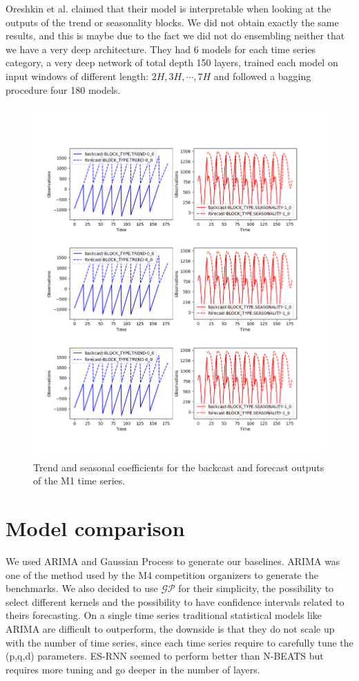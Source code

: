\documentclass{article}
\begin{document}
Oreshkin et al. claimed that their model is interpretable when looking at the outputs of the trend or seasonality blocks. We did not obtain exactly the same results, and this is maybe due to the fact we did not
do ensembling neither that we have a very deep architecture. They had 6 models for each time series category,  a very deep network of total depth 150 layers, trained each model on input windows of
different length: $2H,3H, \cdots, 7H$ and followed a bagging procedure four 180 models.

\begin{figure}[ht]
\centering
	\includegraphics[width=0.8\columnwidth]{M1_stack_reload_100.png} 
\caption{Trend and seasonal coefficients for the backcast and forecast outputs of the M1 time series.}
\label{fig:m1trendseasonality}
\end{figure}


\section{Model comparison}
\label{modelcomparison}

We used ARIMA and Gaussian Process to generate our baselines. ARIMA was one of the method used by the M4 competition organizers to generate the benchmarks.
We also decided to use $\mathcal{GP}$ for their simplicity, the possibility to select different kernels and the possibility to have confidence intervals related to theirs forecasting.
On a single time series traditional statistical models like ARIMA are difficult to outperform, the downside is that they do not scale up with the number of time series, since each time series require to carefully
tune the (p,q,d) parameters. ES-RNN seemed to perform better than N-BEATS but requires more tuning and go deeper in the number of layers.
\end{document}
